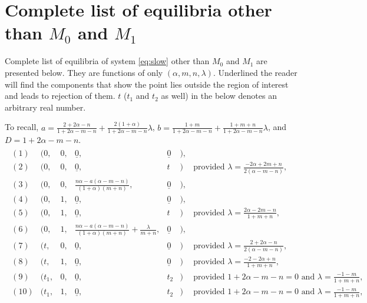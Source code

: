 \documentclass[a4paper,11pt]{article}
\def\blue{\color{blue}}
\theoremstyle{remark}
\begin{document}
{\blue 
\section{Complete list of equilibria other than $M_0$ and $M_1$}\label{append:equi_reject}
Complete list of equilibria of system \eqref{eq:slow} other than $M_0$ and $M_1$ are presented below. They are functions of only $(\alpha,m,n,\lambda)$. Underlined the reader will find the components that show the point lies outside the region of interest and leads to rejection of them. $t$ ($t_1$ and $t_2$ as well) in the below denotes an arbitrary real number. 

To recall, $a=\frac{2+2\alpha-n}{1+2\alpha-m-n} + \frac{2(1 + \alpha)}{1+2\alpha-m-n}\lambda$, $b=\frac{1+m}{1+2\alpha-m-n} + \frac{1+m+n}{1+2\alpha-m-n}\lambda$, and $D=1+2\alpha-m-n$. 
\allowdisplaybreaks
\begin{align*}
 \begin{array}{lllllll}
  (1) &\Big(0,&0,& \underline{0},&\underline{0}&\Big), \\%
  (2) &\Big(0,&0,& \underline{0},&t&            \Big) &\text{provided } \lambda = \frac{-2\alpha+2m+n}{2(\alpha-m-n)},\\
  (3) &\Big(0,&0,& \frac{n\alpha - a(\alpha-m-n)}{(1+\alpha)(m+n)}, &\underline{0}&\Big),\\
  (4) &\Big(0,&1,& \underline{0},&\underline{0}&\Big), \\
  (5) &\Big(0,&1,& \underline{0},&t&           \Big) &\text{provided } \lambda = \frac{2\alpha-2m-n}{1+m+n},\\
  (6) &\Big(0,&1,& \frac{n\alpha - a(\alpha-m-n)}{(1+\alpha)(m+n)}+\frac{\lambda}{m+n}, &\underline{0}&\Big),\\
  (7) &\Big(t,&0,& \underline{0},&\underline{0}&\Big) &\text{provided } \lambda=\frac{2+2\alpha-n}{2(\alpha-m-n)}, \\
  (8) &\Big(t,&1,& \underline{0},&\underline{0}&\Big) &\text{provided } \lambda=\frac{-2-2\alpha+n}{1+m+n}, \\
  (9) &\Big(t_1,&0,& \underline{0},&t_2&           \Big) &\text{provided $1+2\alpha-m-n=0$ and $\lambda=\frac{-1-m}{1+m+n}$}, \\
 (10) &\Big(t_1,&1,& \underline{0},&t_2&           \Big) &\text{provided $1+2\alpha-m-n=0$ and $\lambda=\frac{-1-m}{1+m+n}$}, \\
 \end{array}
\end{align*}
}
\end{document}
